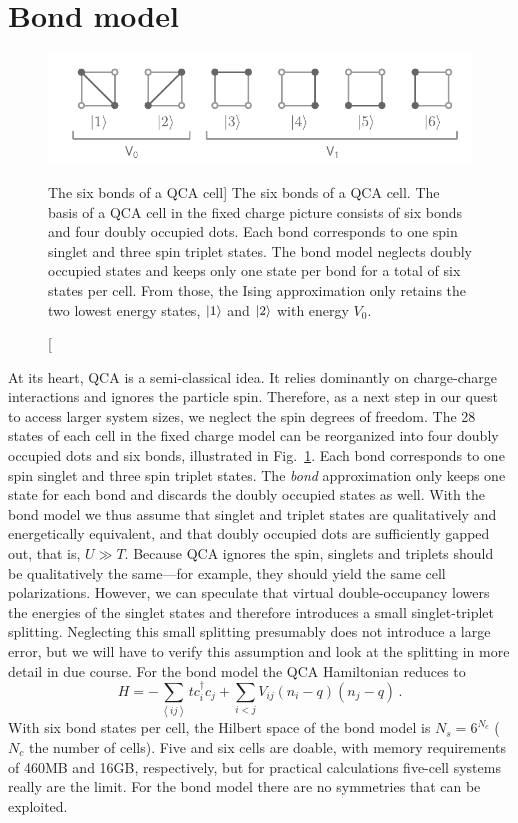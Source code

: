 \section{Bond model}

%
\begin{figure}
  \center
  \includegraphics{bond}
  \caption
  [The six bonds of a QCA cell]
  {
  The six bonds of a QCA cell. The basis of a QCA cell in the fixed charge
  picture consists of six bonds and four doubly occupied dots. Each bond
  corresponds to one spin singlet and three spin triplet states. The bond model
  neglects doubly occupied states and keeps only one state per bond for a total
  of six states per cell. From those, the Ising approximation only retains
  the two lowest energy states, $\left|1\right>$ and $\left|2\right>$ with energy $V_0$.
  }
  \label{fig:bond}
\end{figure}
%
At its heart, QCA is a semi-classical idea. It relies dominantly on
charge-charge interactions and ignores the particle spin. Therefore, as a next
step in our quest to access larger system sizes, we neglect the spin degrees of
freedom. The 28 states of each cell in the fixed charge model can be reorganized
into four doubly occupied dots and six bonds, illustrated in
Fig.~\ref{fig:bond}. Each bond corresponds to one spin singlet and three spin
triplet states. The \emph{bond} approximation only keeps one state for each bond
and discards the doubly occupied states as well. With the bond model we thus
assume that singlet and triplet states are qualitatively and energetically
equivalent, and that doubly occupied dots are sufficiently gapped out, that is,
$U \gg T$. Because QCA ignores the spin, singlets and triplets should be
qualitatively the same---for example, they should yield the same cell
polarizations. However, we can speculate that virtual double-occupancy lowers
the energies of the singlet states and therefore introduces a small
singlet-triplet splitting. Neglecting this small splitting presumably does not
introduce a large error, but we will have to verify this assumption and look at
the splitting in more detail in due course. For the bond model the QCA
Hamiltonian reduces to
%
\begin{equation}
  \label{eq:H_bond}
  H = - \sum_{\left<ij\right>} t c_i^{\dagger} c_j
      + \sum_{i<j} V_{ij} \left( n_i - q \right) \left( n_j - q \right) \, .
\end{equation}
%
With six bond states per cell, the Hilbert space of the bond model is $N_s =
6^{N_c}$ ($N_c$ the number of cells). Five and six cells are doable, with memory
requirements of 460MB and 16GB, respectively, but for practical calculations
five-cell systems really are the limit. For the bond model there are no
symmetries that can be exploited.


